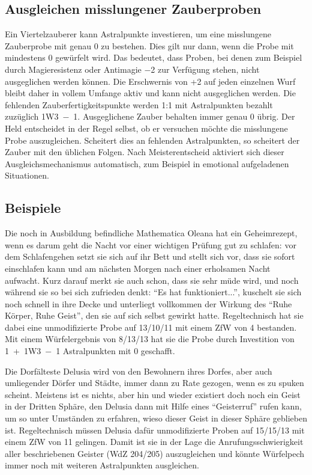 \subsection{Ausgleichen misslungener Zauberproben}
Ein Viertelzauberer kann Astralpunkte investieren, um eine misslungene Zauberprobe mit genau \SI{0}{\ZfPstern} zu bestehen. Dies gilt nur dann, wenn die Probe mit mindestens \SI{0}{\ZfP} gewürfelt wird. Das bedeutet, dass Proben, bei denen zum Beispiel durch Magieresistenz oder Antimagie \SI{-2}{\ZfP} zur Verfügung stehen, nicht ausgeglichen werden können. Die Erschwernis von +2 auf jeden einzelnen Wurf bleibt daher in vollem Umfange aktiv und kann nicht ausgeglichen werden. Die fehlenden Zauberfertigkeitspunkte werden 1:1 mit Astralpunkten bezahlt zuzüglich 1W3~−~\SI{1}{\AsP}. Ausgeglichene Zauber behalten immer genau \SI{0}{\ZfPstern} übrig. Der Held entscheidet in der Regel selbst, ob er versuchen möchte die misslungene Probe auszugleichen. Scheitert dies an fehlenden Astralpunkten, so scheitert der Zauber mit den üblichen Folgen. Nach Meisterentscheid aktiviert sich dieser Ausgleichsmechanismus automatisch, zum Beispiel in emotional aufgeladenen Situationen.

\subsection{Beispiele}
Die noch in Ausbildung befindliche Mathematica Oleana hat ein Geheimrezept, wenn es darum geht die Nacht vor einer wichtigen Prüfung gut zu schlafen: vor dem Schlafengehen setzt sie sich auf ihr Bett und stellt sich vor, dass sie sofort einschlafen kann und am nächsten Morgen nach einer erholsamen Nacht aufwacht. Kurz darauf merkt sie auch schon, dass sie sehr müde wird, und noch während sie so bei sich zufrieden denkt: \enquote{Es hat funktioniert...}, kuschelt sie sich noch schnell in ihre Decke und unterliegt vollkommen der Wirkung des \enquote{Ruhe Körper, Ruhe Geist}, den sie auf sich selbst gewirkt hatte. Regeltechnisch hat sie dabei eine unmodifizierte Probe auf 13/10/11 mit einem ZfW von 4 bestanden. Mit einem Würfelergebnis von 8/13/13 hat sie die Probe durch Investition von 1~+~1W3~−~1 Astralpunkten mit \SI{0}{\ZfPstern} geschafft.

Die Dorfälteste Delusia wird von den Bewohnern ihres Dorfes, aber auch umliegender Dörfer und Städte, immer dann zu Rate gezogen, wenn es zu spuken scheint. Meistens ist es nichts, aber hin und wieder existiert doch noch ein Geist in der Dritten Sphäre, den Delusia dann mit Hilfe eines \enquote{Geisterruf} rufen kann, um so unter Umständen zu erfahren, wieso dieser Geist in dieser Sphäre geblieben ist. Regeltechnisch müssen Delusia dafür unmodifizierte Proben auf 15/15/13 mit einem ZfW von 11 gelingen. Damit ist sie in der Lage die Anrufungsschwierigkeit aller beschriebenen Geister (WdZ 204/205) auszugleichen und könnte Würfelpech immer noch mit weiteren Astralpunkten ausgleichen.

